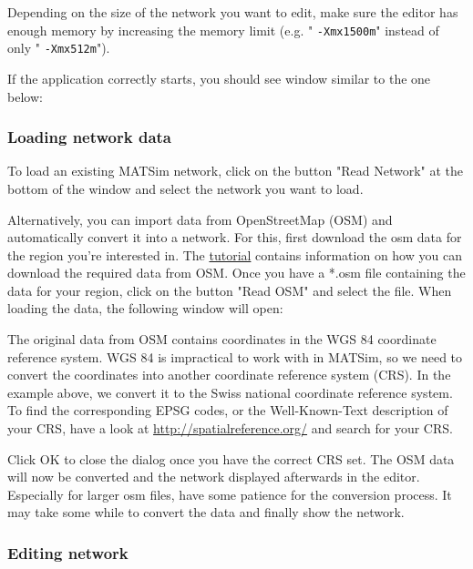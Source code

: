 \documentclass[a4paper,11pt]{report}
\begin{document}
Depending on the size of the network you want to edit, make sure  the editor has enough memory by increasing the memory limit (e.g. "
\texttt{-Xmx1500m}" instead of only "
\texttt{-Xmx512m}").

If the application correctly starts, you should see window similar to the one below:



\subsubsection{Loading network data}

To load an existing MATSim network, click on the button "Read  Network" at the bottom of the window and select the network you want to  load.

Alternatively, you can import data from OpenStreetMap (OSM) and  automatically convert it into a network. For this, first download the  osm data for the region you're interested in. The \href{http://www.matsim.org/docs/tutorials/8lessons/input/creating/network}{tutorial}  contains information on how you can download the required data from  OSM. Once you have a *.osm file containing the data for your region,  click on the button "Read OSM" and select the file. When loading the  data, the following window will open:



The original data from OSM contains coordinates in the WGS 84  coordinate reference system. WGS 84 is impractical to work with in  MATSim, so we need to convert the coordinates into another coordinate  reference system (CRS). In the example above, we convert it to the Swiss  national coordinate reference system. To find the corresponding EPSG  codes, or the Well-Known-Text description of your CRS, have a look at \href{http://spatialreference.org/}{http://spatialreference.org/} and search for your CRS.

Click OK to close the dialog once you have the correct CRS set. The  OSM data will now be converted and the network displayed afterwards in  the editor. Especially for larger osm files, have some patience for the  conversion process. It may take some while to convert the data and  finally show the network.

\subsubsection{Editing network}
\end{document}
